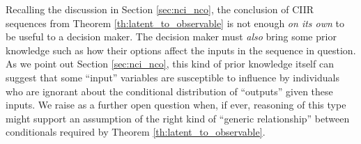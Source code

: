 Recalling the discussion in Section \ref{sec:nci_nco}, the conclusion of CIIR sequences from Theorem \ref{th:latent_to_observable} is not enough \emph{on its own} to be useful to a decision maker. The decision maker must \emph{also} bring some prior knowledge such as how their options affect the inputs in the sequence in question. As we point out Section \ref{sec:nci_nco}, this kind of prior knowledge itself can suggest that some ``input'' variables are susceptible to influence by individuals who are ignorant about the conditional distribution of ``outputs'' given these inputs. We raise as a further open question when, if ever, reasoning of this type might support an assumption of the right kind of ``generic relationship'' between conditionals required by Theorem \ref{th:latent_to_observable}.


